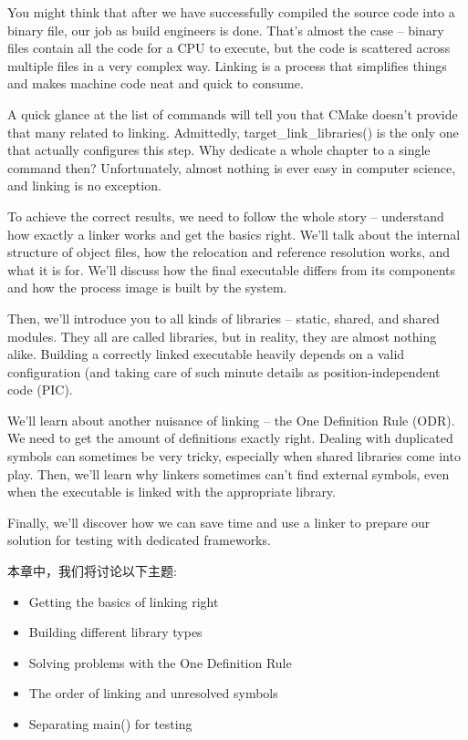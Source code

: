 You might think that after we have successfully compiled the source code into a binary file, our job as build engineers is done. That's almost the case – binary files contain all the code for a CPU to execute, but the code is scattered across multiple files in a very complex way. Linking is a process that simplifies things and makes machine code neat and quick to consume.

A quick glance at the list of commands will tell you that CMake doesn't provide that many related to linking. Admittedly, target\_link\_libraries() is the only one that actually configures this step. Why dedicate a whole chapter to a single command then? Unfortunately, almost nothing is ever easy in computer science, and linking is no exception.

To achieve the correct results, we need to follow the whole story – understand how exactly a linker works and get the basics right. We'll talk about the internal structure of object files, how the relocation and reference resolution works, and what it is for. We'll discuss how the final executable differs from its components and how the process image is built by the system.

Then, we'll introduce you to all kinds of libraries – static, shared, and shared modules.
They all are called libraries, but in reality, they are almost nothing alike. Building a correctly linked executable heavily depends on a valid configuration (and taking care of such minute details as position-independent code (PIC).

We'll learn about another nuisance of linking – the One Definition Rule (ODR). We need to get the amount of definitions exactly right. Dealing with duplicated symbols can sometimes be very tricky, especially when shared libraries come into play. Then, we'll learn why linkers sometimes can't find external symbols, even when the executable is linked with the appropriate library.

Finally, we'll discover how we can save time and use a linker to prepare our solution for testing with dedicated frameworks.

本章中，我们将讨论以下主题:

\begin{itemize}
\item 
Getting the basics of linking right

\item 
Building different library types

\item 
Solving problems with the One Definition Rule

\item 
The order of linking and unresolved symbols

\item 
Separating main() for testing
\end{itemize}